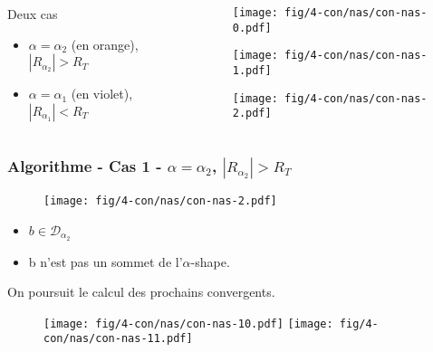 \begin{frame}
\begin{columns}[t]
\begin{column}{0.7\linewidth}
    {
      \begin{alertblock}{Deux cas}
        \begin{itemize}
          \item $\alpha = \alpha_{2}$ (en orange), \textbf{$|R_{\alpha_{2}}| > R_T$}
          \item $\alpha = \alpha_{1}$ (en violet), \textbf{$|R_{\alpha_{1}}| < R_T$}
        \end{itemize}
       \end{alertblock}
    }
  \end{column}
  \begin{column}{0.3\linewidth}
    {
      \begin{figure}[H]
        \centering
        \texttt{[image: fig/4-con/nas/con-nas-0.pdf]}
      \end{figure}
    }
    {
      \begin{figure}[H]
        \centering
        \texttt{[image: fig/4-con/nas/con-nas-1.pdf]}
      \end{figure}
    }
    {
      \begin{figure}[H]
        \centering
        \texttt{[image: fig/4-con/nas/con-nas-2.pdf]}
      \end{figure}
    }
  \end{column}
\end{columns}
\end{frame}

\begin{frame}
\frametitle{Algorithme - Cas 1 - $\alpha = \alpha_{2}$, $|R_{\alpha_{2}}| > R_T$}
{
  \begin{figure}[H]
    \centering
    \texttt{[image: fig/4-con/nas/con-nas-2.pdf]}
  \end{figure}
}

\begin{block}{}
\begin{itemize}
  \item $b \in \mathcal{D}_{\alpha_2}$
  \item \alert{b n'est pas un sommet de l'$\alpha$-shape.}
\end{itemize}

\end{block}

{
  \begin{block}{}
    On poursuit le calcul des prochains convergents.
  \end{block}

  \begin{figure}[H]
    \centering
    \texttt{[image: fig/4-con/nas/con-nas-10.pdf]}
    \texttt{[image: fig/4-con/nas/con-nas-11.pdf]}
  \end{figure}
}

\end{frame}

